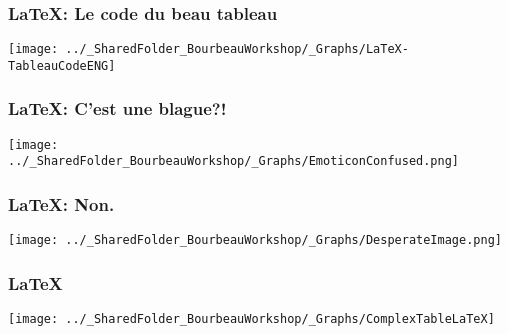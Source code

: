 \documentclass{beamer}
\begin{document}
    \begin{frame}
        \frametitle{\LaTeX: Le code du beau tableau} \vspace{1cm}   
        \begin{center}
           \texttt{[image: ../\_SharedFolder\_BourbeauWorkshop/\_Graphs/LaTeX-TableauCodeENG]}
        \end{center}  
    \end{frame}
    
    \begin{frame}
        \frametitle{\LaTeX: C'est une blague?!} \vspace{1cm}   
        \begin{center}
           \texttt{[image: ../\_SharedFolder\_BourbeauWorkshop/\_Graphs/EmoticonConfused.png]}
        \end{center}  
    \end{frame}
    
    \begin{frame}
        \frametitle{\LaTeX: Non.} \vspace{1cm}   
        \begin{center}
           \texttt{[image: ../\_SharedFolder\_BourbeauWorkshop/\_Graphs/DesperateImage.png]}
        \end{center}  
    \end{frame}
    
    \begin{frame}
        \frametitle{\LaTeX} \vspace{1cm}   
        \begin{center}
           \texttt{[image: ../\_SharedFolder\_BourbeauWorkshop/\_Graphs/ComplexTableLaTeX]}
        \end{center}  
    \end{frame}
    
\end{document}
